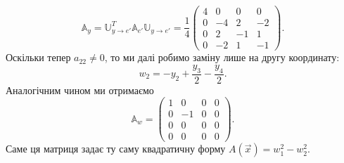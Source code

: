 \documentclass{math_library}
\begin{document}
\begin{example}
\[
\mathbb{A}_y = \mathbb{U}^T_{y \to e'} \mathbb{A}_{e'} \mathbb{U}_{y \to e'} = \dfrac{1}{4} \begin{pmatrix}
4 & 0 & 0 & 0 \\
0 & -4 & 2 & -2 \\
0 & 2 & -1 & 1 \\
0 & -2 & 1 & -1
\end{pmatrix}.
\]
Оскільки тепер $a_{22} \neq 0$, то ми далі робимо заміну лише на другу координату: 
\[
w_2 = -y_2 + \dfrac{y_3}{2} - \dfrac{y_4}{2}.
\]
Аналогічним чином ми отримаємо 
\[
\mathbb{A}_w = \begin{pmatrix}
1 & 0 & 0 & 0 \\
0 & -1 & 0 & 0 \\
0 & 0 & 0 & 0 \\
0 & 0 & 0 & 0
\end{pmatrix}.
\] 
Саме ця матриця задає ту саму квадратичну форму $A(\vec{x}) = w_1^2 - w_2^2$.
\end{example}
\end{document}
